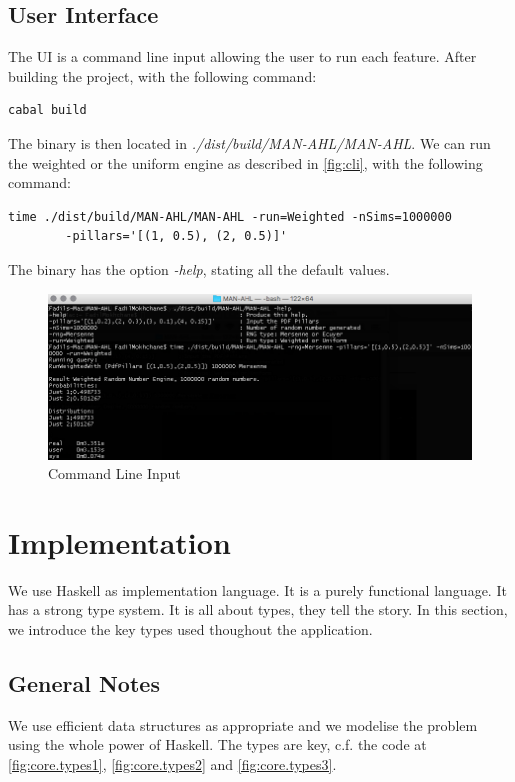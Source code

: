\documentclass[12pt,a4paper,article]{memoir} %
\begin{document}
\subsection{User Interface}
The UI is a command line input allowing the user to run each feature.
After building the project, with the following command:
\begin{verbatim}
cabal build
\end{verbatim}
The binary is then located in \emph{./dist/build/MAN-AHL/MAN-AHL}.
We can run the weighted or the uniform engine
 as described in \autoref{fig:cli}, with the following command:
\begin{verbatim}
time ./dist/build/MAN-AHL/MAN-AHL -run=Weighted -nSims=1000000
        -pillars='[(1, 0.5), (2, 0.5)]'
\end{verbatim}
 The binary has the option \emph{-help}, stating all the default values.
\begin{figure}[h!]
\begin{center}
\includegraphics[width=1\textwidth]{img/cli.png}
\caption{Command Line Input}
\label{fig:cli}
\end{center}
\end{figure}

\section{Implementation}

We use Haskell as implementation language. It is a purely functional language.
It has a strong type system. It is all about types, they tell the story.
In this section, we introduce the key types used thoughout the application.

\subsection{General Notes}
We use efficient data structures as appropriate and we modelise the problem using
the whole power of Haskell. 
The types are key, c.f. the code at \autoref{fig:core.types1}, \autoref{fig:core.types2}
and \autoref{fig:core.types3}.
\end{document}
